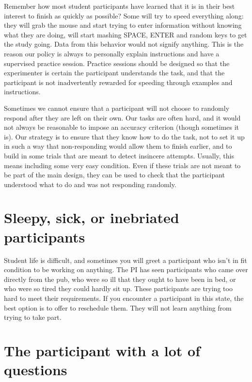 \documentclass[12pt,]{book}
\theoremstyle{definition}
\theoremstyle{definition}
\theoremstyle{definition}
\theoremstyle{remark}
\begin{document}
Remember how most student participants have learned that it is in their
best interest to finish as quickly as possible? Some will try to speed
everything along: they will grab the mouse and start trying to enter
information without knowing what they are doing, will start mashing
SPACE, ENTER and random keys to get the study going. Data from this
behavior would not signify anything. This is the reason our policy is
always to personally explain instructions and have a supervised practice
session. Practice sessions should be designed so that the experimenter
is certain the participant understands the task, and that the
participant is not inadvertently rewarded for speeding through examples
and instructions.

Sometimes we cannot ensure that a participant will not choose to
randomly respond after they are left on their own. Our tasks are often
hard, and it would not always be reasonable to impose an accuracy
criterion (though sometimes it is). Our strategy is to ensure that they
know how to do the task, not to set it up in such a way that
non-responding would allow them to finish earlier, and to build in some
trials that are meant to detect insincere attempts. Usually, this means
including some very easy condition. Even if these trials are not meant
to be part of the main design, they can be used to check that the
participant understood what to do and was not responding randomly.

\section{Sleepy, sick, or inebriated
participants}\label{sleepy-sick-or-inebriated-participants}

Student life is difficult, and sometimes you will greet a participant
who isn't in fit condition to be working on anything. The PI has seen
participants who came over directly from the pub, who were so ill that
they ought to have been in bed, or who were so tired they could hardly
sit up. These participants are trying too hard to meet their
requirements. If you encounter a participant in this state, the best
option is to offer to reschedule them. They will not learn anything from
trying to take part.

\section{The participant with a lot of
questions}\label{the-participant-with-a-lot-of-questions}
\end{document}
